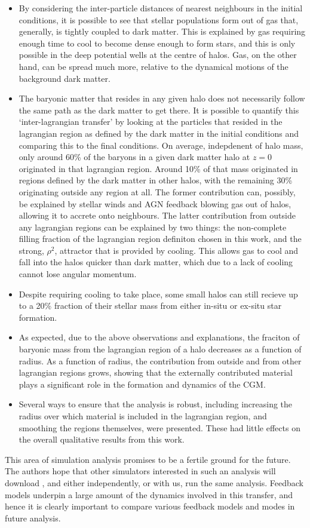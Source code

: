 \begin{itemize}
    \item By considering the inter-particle distances of nearest neighbours
    in the initial conditions, it is possible to see that stellar populations
    form out of gas that, generally, is tightly coupled to dark matter. This
    is explained by gas requiring enough time to cool to become dense enough
    to form stars, and this is only possible in the deep potential wells at
    the centre of halos. Gas, on the other hand, can be spread much more,
    relative to the dynamical motions of the background dark matter.
    \item The baryonic matter that resides in any given halo does not necessarily
    follow the same path as the dark matter to get there. It is possible to
    quantify this `inter-lagrangian transfer' by looking at the particles
    that resided in the lagrangian region as defined by the dark matter in the
    initial conditions and comparing this to the final conditions. On average,
    indepdenent of halo mass, only around 60\% of the baryons in a given
    dark matter halo at $z=0$ originated in that lagrangian region.
    Around 10\% of that mass originated in regions defined by the dark matter
    in other halos, with the remaining 30\% originating outside any region
    at all. The former contribution can, possibly, be explained by stellar
    winds and AGN feedback blowing gas out of halos, allowing it to accrete
    onto neighbours. The latter contribution from outside any lagrangian regions
    can be explained by two things: the non-complete filling fraction of the
    lagrangian region definiton chosen in this work, and the strong, $\rho^2$,
    attractor that is provided by cooling. This allows gas to cool and fall
    into the halos quicker than dark matter, which due to a lack of cooling
    cannot lose angular momentum.
    \item Despite requiring cooling to take place, some small halos can still
    recieve up to a 20\% fraction of their stellar mass from either in-situ
    or ex-situ star formation.
    \item As expected, due to the above observations and explanations, the
    fraciton of baryonic mass from the lagrangian region of a halo decreases
    as a function of radius. As a function of radius, the contribution from
    outside and from other lagrangian regions grows, showing that the
    externally contributed material plays a significant role in the formation
    and dynamics of the CGM.
    \item Several ways to ensure that the analysis is robust, including
    increasing the radius over which material is included in the lagrangian
    region, and smoothing the regions themselves, were presented. These had
    little effects on the overall qualitative results from this work.
\end{itemize}
This area of simulation analysis promises to be a fertile ground for the
future. The authors hope that other simulators interested in such an analysis
will download \ltcaesar{}, and either independently, or with us, run the
same analysis. Feedback models underpin a large amount of the dynamics
involved in this transfer, and hence it is clearly important to compare
various feedback models and modes in future analysis.

